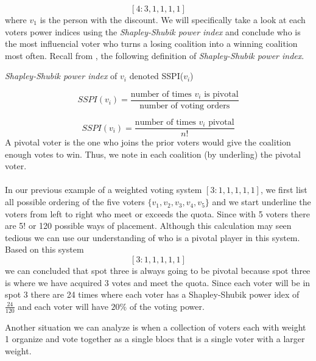 \documentclass[12pt]{article}
\newenvironment{definition}[1][Definition]{\begin{trivlist}
\item[\hskip \labelsep {\bfseries #1}]}{\end{trivlist}}
\begin{document}
$$[4:3,1,1,1,1]$$ where $v_1$ is the person with the discount. We will specifically take a look at each voters power indices using the \textit{Shapley-Shubik power index} and conclude who is the most influencial voter who turns a losing coalition into a winning coalition most often. Recall from \cite{M}, the following definition of \textit{Shapley-Shubik power index}.
\begin{definition}
\textit{Shapley-Shubik power index} of $v_i$ denoted SSPI($v_i$)

$$SSPI(v_i) = \frac{\text{number of times $v_i$ is pivotal}}{\text{number of voting orders}}$$
\end{definition}
$$ SSPI(v_i) = \frac{\text{number of times $v_i$ pivotal}}{n!}$$
A pivotal voter is the one who joins the prior voters would give the coalition enough votes to win. Thus, we note in each coalition (by underling) the pivotal voter.
\\
\\
\noindent In our previous  example of a weighted voting system $[3:1,1,1,1,1]$, we first list all possible ordering of the five voters ${\{v_1,v_2,v_3,v_4,v_5\}}$ and we start underline the voters from left to right who meet or exceeds the quota. Since with 5 voters there are 5! or 120 possible ways of placement. Although this calculation may seen tedious we can use our understanding of who is a pivotal player in this system. Based on this system $$[3:1,1,1,1,1]$$ we can concluded that spot three is always going to be pivotal because spot three is where we have acquired 3 votes and meet the quota. Since each voter will be in spot 3 there are 24 times where each voter has a Shapley-Shubik power idex of $\frac{24}{120}$ and each voter will have $20\%$ of the voting power.

Another situation we can analyze is when a collection of voters each with weight 1 organize and vote together as a single blocs that is a single voter with a larger weight.
\end{document}
